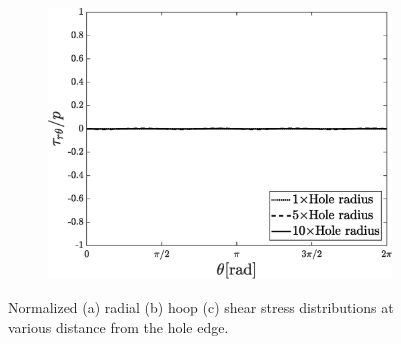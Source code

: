 \documentclass{article}
\begin{document}
\begin{figure}[H]
        \begin{subfigure}{0.5\textwidth}
            \includegraphics[width=1\linewidth, height=0.8\linewidth]{figures/tau_rt.eps} 
            \caption{}
            \label{fig:tau_rt}
        \end{subfigure}
    \caption{Normalized (a) radial (b) hoop (c) shear stress distributions at various distance from the hole edge.}
    \label{fig:polar_stress_at_distance}
\end{figure}
\end{document}
